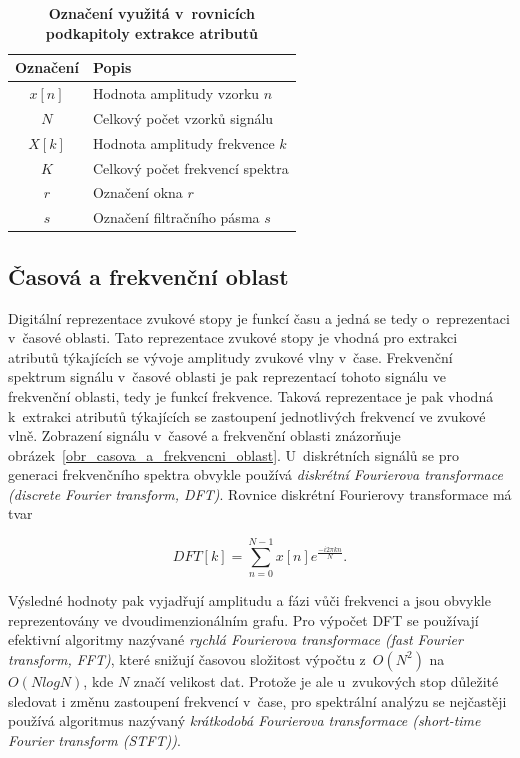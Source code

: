 \begin{table}[H]
	\vskip6pt
	\caption{\textbf{Označení využitá v~rovnicích podkapitoly extrakce atributů}}
    \vskip6pt
	\centering
    \begin{tabular}{c | l} 
        \textbf{Označení} & \textbf{Popis} \\ [0.5ex] 
        \hline\hline
        $x[n]$ & Hodnota amplitudy vzorku $n$\\
        \hline
        $N$ & Celkový počet vzorků signálu \\
        \hline
        $X[k]$ & Hodnota amplitudy frekvence $k$ \\
        \hline
        $K$ & Celkový počet frekvencí spektra\\
        \hline
        $r$ & Označení okna $r$ \\
        \hline
        $s$ & Označení filtračního pásma $s$ \\
        \hline\hline
    \end{tabular}
	\label{oznaceni_v_rovnicich_extrakce}
\end{table}

\subsection*{Časová a frekvenční oblast}
\label{casova_a_frekvencni_oblast}
Digitální reprezentace zvukové stopy je funkcí času a jedná se tedy o~reprezentaci v~časové oblasti. Tato reprezentace zvukové stopy je vhodná pro extrakci atributů týkajících se vývoje amplitudy zvukové vlny v~čase. Frekvenční spektrum signálu v~časové oblasti je pak reprezentací tohoto signálu ve frekvenční oblasti, tedy je funkcí frekvence. Taková reprezentace je pak vhodná k~extrakci atributů týkajících se zastoupení jednotlivých frekvencí ve zvukové vlně. Zobrazení signálu v~časové a frekvenční oblasti znázorňuje obrázek~\ref{obr_casova_a_frekvencni_oblast}. U~diskrétních signálů se pro generaci frekvenčního spektra obvykle používá \textit{diskrétní Fourierova transformace (discrete Fourier transform, DFT)}. Rovnice diskrétní Fourierovy transformace má tvar

\begin{equation}
	DFT[k] = \sum\limits_{n=0}^{N-1} x[n]e^{\frac{-i2\pi kn}{N}}.
\end{equation}\cite{MIR}\cite{mircom}\cite{aca}

\medskip

Výsledné hodnoty pak vyjadřují amplitudu a fázi vůči frekvenci a jsou obvykle reprezentovány ve dvoudimenzionálním grafu. Pro výpočet DFT se používají efektivní algoritmy nazývané \textit{rychlá Fourierova transformace (fast Fourier transform, FFT)}, které snižují časovou složitost výpočtu z~$O(N^2)$ na $O(N log N)$, kde $N$ značí velikost dat. Protože je ale u~zvukových stop důležité sledovat i změnu zastoupení frekvencí v~čase, pro spektrální analýzu se nejčastěji používá algoritmus nazývaný \textit{krátkodobá Fourierova transformace (short-time Fourier transform (STFT))}.\cite{MIR}\cite{mircom}\cite{aca}

